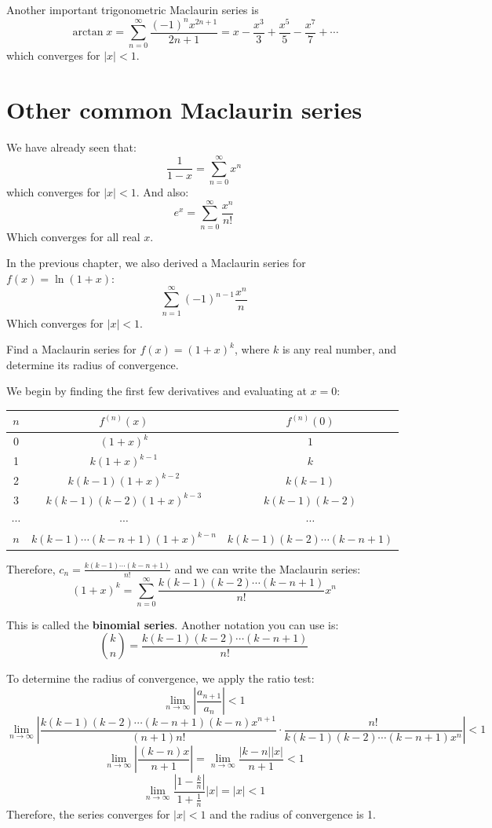 Another important trigonometric Maclaurin series is
$$\arctan{x} = \sum_{n=0}^\infty \frac{(-1)^n x^{2n + 1}}{2n + 1} = x - \frac{x^3}{3} + \frac{x^5}{5} - \frac{x^7}{7} + \cdots$$
which converges for $|x|<1$. 

\section{Other common Maclaurin series}
We have already seen that:
$$\frac{1}{1 - x} = \sum_{n=0}^\infty x^n$$
which converges for $|x| < 1$. And also:
$$e^x = \sum_{n=0}^\infty \frac{x^n}{n!}$$
Which converges for all real $x$.

In the previous chapter, we also derived a Maclaurin series for $f(x) = \ln{(1 
+ x)}$:
$$\sum_{n=1}^\infty (-1)^{n-1} \frac{x^n}{n}$$
Which converges for $|x|<1$.

\begin{Worked}
\begin{Problem}
Find a Maclaurin series for $f(x) = (1 + x)^k$, where $k$ is 
any real number, and determine its radius of convergence.
\end{Problem}
\begin{Solution}
We begin by finding the first few derivatives and 
evaluating at $x = 0$:
\begin{center}
	\begin{tabular}{|c|c|c|}\hline
	$n$ & $f^{(n)}(x)$ & $f^{(n)}(0)$\\\hline
	0 & $(1 + x)^k$ & $1$\\\hline
	1 & $k(1 + x)^{k - 1}$ & $k$\\\hline
	2 & $k(k-1)(1 + x)^{k - 2}$ & $k(k-1)$\\\hline
	3 & $k(k-1)(k-2)(1 + x)^{k-3}$ & $k(k-1)(k-2)$\\\hline
	$\cdots$ & $\cdots$ & $\cdots$\\\hline
	$n$ & $k(k-1)\cdots(k-n+1)(1+x)^{k-n}$ & $k(k-1)(k-2)\cdots(k - n + 1)$\\
	\hline
	\end{tabular}
\end{center}

Therefore, $c_n = \frac{k(k-1)\cdots(k - n + 1)}{n!}$ and we can write the 
Maclaurin series:
$$(1 + x)^k = \sum_{n=0}^\infty \frac{k(k-1)(k-2)\cdots(k - n + 1)}{n!}x^n$$

This is called the \textbf{binomial series}. Another 
notation you can use is:
$$\binom{k}{n} = \frac{k(k-1)(k-2)\cdots(k-n+1)}{n!}$$

To determine the radius of convergence, we apply the ratio test:
$$\lim_{n \to \infty} \left| \frac{a_{n + 1}}{a_n} \right| < 1$$
$$\lim_{n \to \infty} \left| \frac{k(k-1)(k-2)\cdots(k - n + 1)(k -n)x^{n + 1}}
{(n + 1)n!} \cdot \frac{n!}{k(k-1)(k-2)\cdots(k-n+1)x^n} \right| < 1$$
$$\lim_{n \to \infty} \left| \frac{(k-n)x}{n + 1} \right| = \lim_{n \to \infty} 
\frac{|k - n||x|}{n + 1} < 1$$
$$\lim_{n \to \infty} \frac{\left| 1 - \frac{k}{n} \right|}{1 + \frac{1}{n}}|x| 
= |x| < 1$$
Therefore, the series converges for $|x|<1$ and the radius of convergence is 1.
\end{Solution}
\end{Worked}

